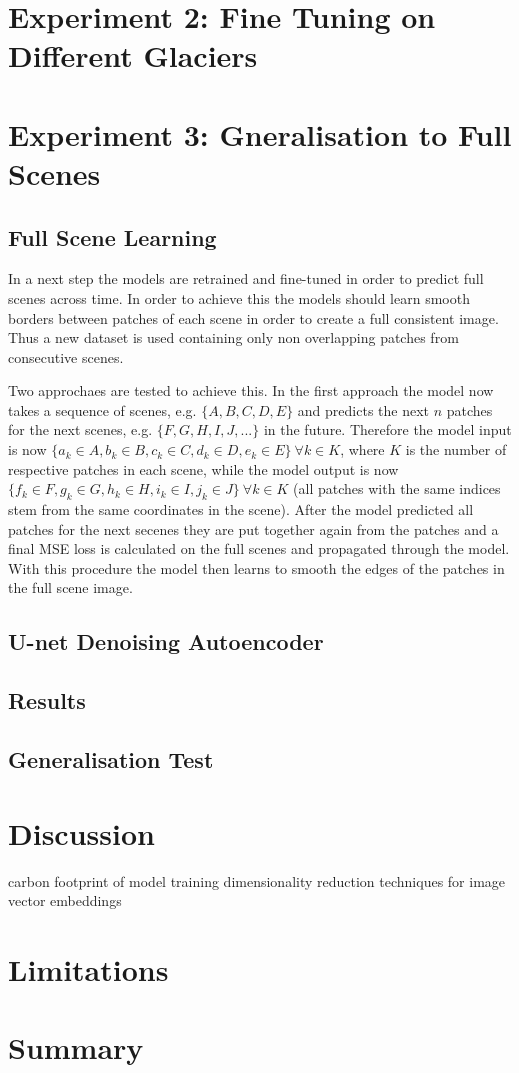 \documentclass[12pt]{article}
\begin{document}
\section{Experiment 2: Fine Tuning on Different Glaciers}

\section{Experiment 3: Gneralisation to Full Scenes}
\subsection{Full Scene Learning}
 In a next step the models are retrained and fine-tuned in order to predict full scenes across time. In order to achieve this the models should learn smooth borders between patches of each scene in order to create a full consistent image. Thus a new dataset is used containing only non overlapping patches from consecutive scenes. 
 
 Two approchaes are tested to achieve this. In the first approach the model now takes a sequence of scenes, e.g. $\{A, B, C, D, E\}$ and predicts the next $n$ patches for the next scenes, e.g. $\{F, G, H, I, J, ...\}$ in the future. Therefore the model input is now $\{a_k \in A, b_k \in B, c_k \in C, d_k \in D, e_k \in E\} \ \forall k \in K$, where $K$ is the number of respective patches in each scene, while the model output is now $\{f_k \in F, g_k \in G, h_k \in H, i_k \in I, j_k \in J\} \ \forall k \in K$ (all patches with the same indices stem from the same coordinates in the scene). After the model predicted all patches for the next secenes they are put together again from the patches and a final MSE loss is calculated on the full scenes and propagated through the model. With this procedure the model then learns to smooth the edges of the patches in the full scene image.
\subsection{U-net Denoising Autoencoder}
 
 

\subsection{Results}
\subsection{Generalisation Test}

\section{Discussion}
carbon footprint of model training
dimensionality reduction techniques for image vector embeddings
\section{Limitations}

\section{Summary}





\newpage



\end{document}
